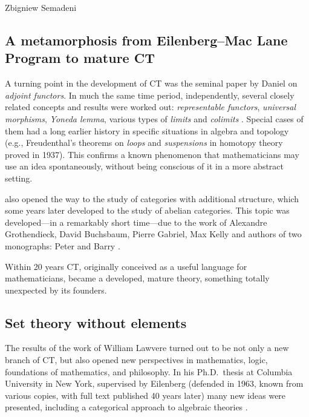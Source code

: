 \begin{artengenv}{Zbigniew Semadeni}
\subsection{A metamorphosis from Eilenberg--Mac Lane Program to mature CT}
A turning point in the development of CT was the seminal paper by Daniel \citeauthor{Kan} \parencite*{Kan}
on \textit{adjoint functors}. In much the same time period, independently, 
several closely related concepts and results were worked out: \textit{representable 
functors}, \textit{universal morphisms}, \textit{Yoneda lemma}, various types of 
\textit{limits} and \textit{colimits} \parencite[pp.345--352]{Century}. Special cases of 
them had a long earlier history in specific situations in algebra and topology 
(e.g., Freudenthal's theorems on \textit{loops} and \textit{suspensions} in homotopy 
theory proved in 1937). This confirms a known phenomenon that mathematicians may use 
an idea spontaneously, without being conscious of it in a more abstract setting. 

\citeauthor{Duality} \parencite*{Duality} also opened the way to the study of categories with additional 
structure, which some years later developed to the study of abelian categories. This 
topic was developed---in a remarkably short time---due to the work of Alexandre 
Grothendieck, David Buchsbaum, Pierre Gabriel, Max Kelly and authors of two 
monographs: Peter  \citeauthor{Freyd} \parencite*{Freyd} and Barry \citeauthor{Mitchell} \parencite*{Mitchell}. 

Within 20 years CT, originally conceived as a useful language for mathematicians, 
became a developed, mature theory, something totally unexpected by its founders. 

\subsection{Set theory without elements} 
The results of the work of William Lawvere turned out to be not only a new branch of 
CT, but also opened new perspectives in mathematics, logic, foundations of mathematics, 
and philosophy. In his Ph.D.\ thesis at Columbia University in New York, 
supervised by Eilenberg (defended in 1963, known from various copies, with full 
text published 40 years later) many new ideas were presented, including a 
categorical approach to algebraic theories \parencite{Law-Semant}. 


\end{artengenv}

